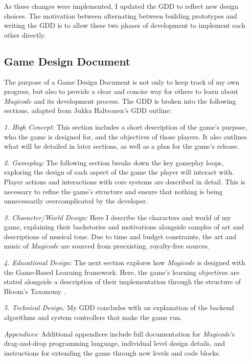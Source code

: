 \documentclass[10pt,twocolumn]{article}
\begin{document}
As these changes were implemented, I updated the GDD to reflect new design choices. The motivation between alternating between building prototypes and writing the GDD is to allow these two phases of development to implement each other directly.


\subsection{Game Design Document}
The purpose of a Game Design Document is not only to keep track of my own progress, but also to provide a clear and concise way for others to learn about \textit{Magicode} and its development process. The GDD is broken into the following sections, adapted from Jukka Haltsonen’s \cite{gdd-guide} GDD outline:

\textit{1. High Concept:} This section includes a short description of the game’s purpose, who the game is designed for, and the objectives of those players. It also outlines what will be detailed in later sections, as well as a plan for the game’s release.

\textit{2. Gameplay:} The following section breaks down the key gameplay loops, exploring the design of each aspect of the game the player will interact with. Player actions and interactions with core systems are described in detail. This is necessary to refine the game’s structure and ensure that nothing is being unnecessarily overcomplicated by the developer.

\textit{3. Character/World Design:} Here I describe the characters and world of my game, explaining their backstories and motivations alongside samples of art and descriptions of musical tone. Due to time and budget constraints, the art and music of \textit{Magicode} are sourced from preexisting, royalty-free sources.

\textit{4. Educational Design:} The next section explores how \textit{Magicode} is designed with the Game-Based Learning framework. Here, the game’s learning objectives are stated alongside a description of their implementation through the structure of Bloom’s Taxonomy \cite{bloom-taxonomy}.

\textit{5. Technical Design:} My GDD concludes with an explanation of the backend algorithms and system controllers that make the game run.

\textit{Appendices:} Additional appendices include full documentation for \textit{Magicode}’s drag-and-drop programming language, individual level design details, and instructions for extending the game through new levels and code blocks.
\end{document}
